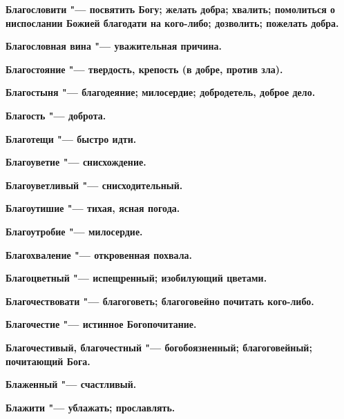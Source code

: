 \begin{mymulticols}{2}
\bfseries Благословити\normalfont{} "--- посвятить Богу; желать добра; хвалить; помолиться о ниспослании Божией благодати на кого-либо; дозволить; пожелать добра. 




\bfseries Благословная вина\normalfont{} "--- уважительная причина. 




\bfseries Благостояние\normalfont{} "--- твердость, крепость (в добре, против зла). 




\bfseries Благостыня\normalfont{} "--- благодеяние; милосердие; добродетель, доброе дело. 




\bfseries Благость\normalfont{} "--- доброта. 




\bfseries Благотещи\normalfont{} "--- быстро идти. 




\bfseries Благоуветие\normalfont{} "--- снисхождение. 




\bfseries Благоуветливый\normalfont{} "--- снисходительный. 




\bfseries Благоутишие\normalfont{} "--- тихая, ясная погода. 




\bfseries Благоутробие\normalfont{} "--- милосердие. 




\bfseries Благохваление\normalfont{} "--- откровенная похвала. 




\bfseries Благоцветный\normalfont{} "--- испещренный; изобилующий цветами. 




\bfseries Благочествовати\normalfont{} "--- благоговеть; благоговейно почитать кого-либо. 




\bfseries Благочестие\normalfont{} "--- истинное Богопочитание. 




\bfseries Благочестивый, благочестный\normalfont{} "--- богобоязненный; благоговейный; почитающий Бога. 




\bfseries Блаженный\normalfont{} "--- счастливый. 




\bfseries Блажити\normalfont{} "--- ублажать; прославлять. 





\end{mymulticols}
